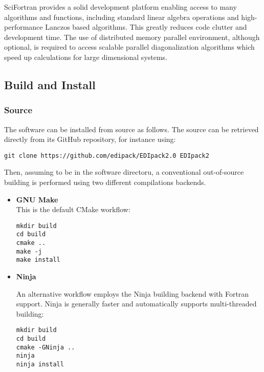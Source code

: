 \documentclass[final,3p,10pt]{elsarticle}
\begin{document}
SciFortran provides a solid development platform enabling access to
many algorithms and functions, including standard linear algebra
operations and high-performance Lanczos based algorithms. This
greatly reduces code clutter and development time.
The use of distributed memory parallel environment, although optional,
is required to access scalable parallel diagonalization algorithms
which speed up calculations for large dimensional systems. 

\subsection{Build and Install}
\subsubsection{Source}
The software can be installed from source as follows. The source can
be retrieved directly from its GitHub repository, for instance using:
\begin{lstlisting}[style=mybash]
git clone https://github.com/edipack/EDIpack2.0 EDIpack2
\end{lstlisting}
Then, assuming to be in the software directoru, a conventional
out-of-source building is performed using two different compilations
backends.

\begin{itemize}
  \item {\bf GNU Make}\\
This is the default CMake workflow:
\begin{lstlisting}[style=mybash]
mkdir build
cd build
cmake ..
make -j
make install
\end{lstlisting}


\item{\bf Ninja}

An alternative workflow employs the Ninja building backend with
Fortran support. Ninja is generally faster and automatically supports
multi-threaded building:
\begin{lstlisting}[style=mybash]
mkdir build
cd build
cmake -GNinja ..
ninja
ninja install
\end{lstlisting}
\end{itemize}
\end{document}
